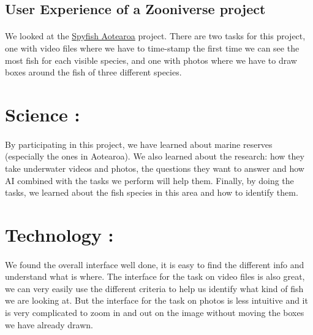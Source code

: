 \documentclass[14pt]
{article}
\begin{document}
\pagestyle{fancy}

\bigskip
\begin{center}
	\section*{\textbf{{\LARGE User Experience of a Zooniverse project}}}
\end{center}
\bigskip\bigskip\bigskip

\paragraph*{}We looked at the \href{https://www.zooniverse.org/projects/victorav/spyfish-aotearoa}{Spyfish Aotearoa} project. There are two tasks for this project, one with video files where we have to time-stamp the first time we can see the most fish for each visible species, and one with photos where we have to draw boxes around the fish of three different species.\\

\section*{Science :}
\paragraph*{}By participating in this project, we have learned about marine reserves (especially the ones in Aotearoa). We also learned about the research: how they take underwater videos and photos, the questions they want to answer and how AI combined with the tasks we perform will help them. Finally, by doing the tasks, we learned about the fish species in this area and how to identify them.\\

\section*{Technology :}
\paragraph*{}We found the overall interface well done, it is easy to find the different info and understand what is where. The interface for the task on video files is also great, we can very easily use the different criteria to help us identify what kind of fish we are looking at. But the interface for the task on photos is less intuitive and it is very complicated to zoom in and out on the image without moving the boxes we have already drawn.\\
\end{document}
